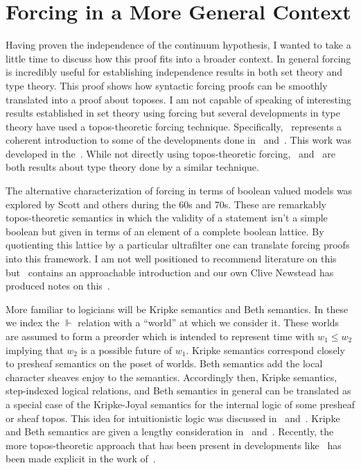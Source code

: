 \section{Forcing in a More General Context}\label{sec:conclusion}

Having proven the independence of the continuum hypothesis, I wanted
to take a little time to discuss how this proof fits into a broader
context. In general forcing is incredibly useful for establishing
independence results in both set theory and type theory. This proof
shows how syntactic forcing proofs can be smoothly translated into a
proof about toposes. I am not capable of speaking of interesting
results established in set theory using forcing but several
developments in type theory have used a topos-theoretic forcing
technique. Specifically,~\citet{Coquand:12} represents a coherent
introduction to some of the developments done in~\citet{Coquand:04}
and~\citet{Coquand:16}. This work was developed in
the~\citet{Jaber:14}. While not directly using topos-theoretic
forcing,~\citet{Escardo:13} and~\citet{Sterling:16} are both results
about type theory done by a similar technique.

The alternative characterization of forcing in terms of boolean valued
models was explored by Scott and others during the 60s and 70s. These
are remarkably topos-theoretic semantics in which the validity of a
statement isn't a simple boolean but given in terms of an element of a
complete boolean lattice. By quotienting this lattice by a particular
ultrafilter one can translate forcing proofs into this framework. I am
not well positioned to recommend literature on this
but~\citet{Jech:08} contains an approachable introduction and our own
Clive Newstead has produced notes on this~\cite{Newstead:12}.

More familiar to logicians will be Kripke semantics and Beth
semantics. In these we index the $\Vdash$ relation with a ``world'' at
which we consider it. These worlds are assumed to form a preorder
which is intended to represent time with $w_1 \le w_2$ implying that
$w_2$ is a possible future of $w_1$. Kripke semantics correspond
closely to presheaf semantics on the poset of worlds. Beth semantics
add the local character sheaves enjoy to the semantics. Accordingly
then, Kripke semantics, step-indexed logical relations, and Beth
semantics in general can be translated as a special case of the
Kripke-Joyal semantics for the internal logic of some presheaf or
sheaf topos. This idea for intuitionistic logic was discussed
in~\citet{Fourman:82} and~\citet{Fourman:13}. Kripke and Beth
semantics are given a lengthy consideration in~\citet{Dummett:00}
and~\citet{Troelstra:88}. Recently, the more topos-theoretic approach
that has been present in developments like~\citet{Dreyer:09} has been
made explicit in the work of~\citet{Birkedal:11}.
